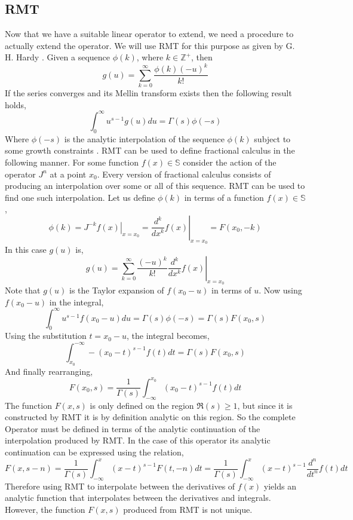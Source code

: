 \documentclass[%
 onecolumn,
 amsmath, amssymb, aps, pra, 10pt
]{revtex4-2}
\begin{document}
\subsection{RMT}
Now that we have a suitable linear operator to extend, we need a procedure to actually extend the operator. We will use RMT for this purpose as given by G. H. Hardy \cite[p.~186]{hardy1940ramanujan}. Given a sequence $\phi(k)$, where $k \in \mathbb{Z}^+$, then
\[g(u) = \sum_{k=0}^\infty \frac{\phi(k)(-u)^k}{k!}\]
If the series converges and its Mellin transform exists then the following result holds,
\[\int_0^{\infty} u^{s-1}g(u)du = \Gamma(s)\phi(-s)\]
Where $\phi(-s)$ is the analytic interpolation of the sequence $\phi(k)$ subject to some growth constraints \cite[p.~188--189]{hardy1940ramanujan}.
RMT can be used to define fractional calculus in the following manner. For some function $f(x) \in \mathbb{S}$ consider the action of the operator $J^n$ at a point $x_0$. Every version of fractional calculus consists of producing an interpolation over some or all of this sequence. RMT can be used to find one such interpolation. Let us define $\phi(k)$ in terms of a function $f(x) \in \mathbb{S}$ ,
\[\phi(k) = \left. J^{-k}f(x)\right|_{x = x_0} = \left. \frac{d^k}{dx^k}f(x) \right|_{x = x_0} = F(x_0, -k)\]
In this case $g(u)$ is,
\[g(u) = \sum_{k=0}^\infty \frac{(-u)^k}{k!} \left. \frac{d^k}{dx^k}f(x)\right|_{x=x_0}\]
Note that $g(u)$ is the Taylor expansion of $f(x_0 - u)$ in terms of $u$. Now using $f(x_0 - u)$ in the integral,
\[\int_0^{\infty} u^{s-1}f(x_0 - u)du = \Gamma(s)\phi(-s) = \Gamma(s)F(x_0, s)\]
Using the substitution $t = x_0 - u$, the integral becomes,
\[\int_{x_0}^{-\infty} -(x_0 - t)^{s-1}f(t)dt = \Gamma(s)F(x_0, s)\]
And finally rearranging,
\[F(x_0, s) = \frac{1}{\Gamma(s)} \int_{-\infty}^{x_0} (x_0 - t)^{s-1} f(t)dt\]
The function $F(x, s)$ is only defined on the region $\mathfrak{R}(s) \geq 1$, but since it is constructed by RMT it is by definition analytic on this region. So the complete Operator must be defined in terms of the analytic continuation of the interpolation produced by RMT. In the case of this operator its analytic continuation can be expressed using the relation, 
\begin{equation}
F(x, s-n) = \frac{1}{\Gamma(s)} \int_{-\infty}^{x} (x - t)^{s-1} F(t, -n)dt = \frac{1}{\Gamma(s)} \int_{-\infty}^{x} (x - t)^{s-1} \frac{d^n}{dt^n}f(t)dt
\label{analytic_continuation}
\end{equation}
Therefore using RMT to interpolate between the derivatives of $f(x)$ yields an analytic function that interpolates between the derivatives and integrals. However, the function $F(x, s)$ produced from RMT is not unique.
\end{document}
